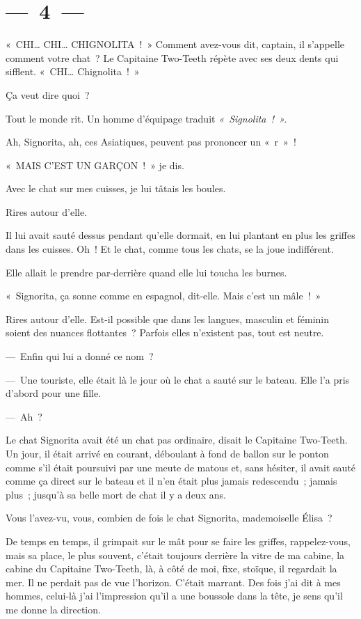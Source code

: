 \documentclass[french,twoside]{book} %
\begin{document}
\section[{— 4 —}]{— 4 —}
\renewcommand{\leftmark}{— 4 —}

\noindent « CHI… CHI… CHIGNOLITA ! » Comment avez-vous dit, captain, il s’appelle comment votre chat ? Le Capitaine Two-Teeth répète avec ses deux dents qui sifflent. « CHI… Chignolita ! »\par
Ça veut dire quoi ?\par
Tout le monde rit. Un homme d’équipage traduit \emph{« Signolita ! ».}\par
Ah, Signorita, ah, ces Asiatiques, peuvent pas prononcer un « r » !\par
« MAIS C’EST UN GARÇON ! » je dis.\par
Avec le chat sur mes cuisses, je lui tâtais les boules.\par
Rires autour d’elle.\par
Il lui avait sauté dessus pendant qu’elle dormait, en lui plantant en plus les griffes dans les cuisses. Oh ! Et le chat, comme tous les chats, se la joue indifférent.\par
Elle allait le prendre par-derrière quand elle lui toucha les burnes.\par
« Signorita, ça sonne comme en espagnol, dit-elle. Mais c’est un mâle ! »\par
Rires autour d’elle. Est-il possible que dans les langues, masculin et féminin soient des nuances flottantes ? Parfois elles n’existent pas, tout est neutre.\par
— Enfin qui lui a donné ce nom ?\par
— Une touriste, elle était là le jour où le chat a sauté sur le bateau. Elle l’a pris d’abord pour une fille.\par
— Ah ?\par
Le chat Signorita avait été un chat pas ordinaire, disait le Capitaine Two-Teeth. Un jour, il était arrivé en courant, déboulant à fond de ballon sur le ponton comme s’il était poursuivi par une meute de matous et, sans hésiter, il avait sauté comme ça direct sur le bateau et il n’en était plus jamais redescendu ; jamais plus ; jusqu’à sa belle mort de chat il y a deux ans.\par
Vous l’avez-vu, vous, combien de fois le chat Signorita, mademoiselle Élisa ?\par
De temps en temps, il grimpait sur le mât pour se faire les griffes, rappelez-vous, mais sa place, le plus souvent, c’était toujours derrière la vitre de ma cabine, la cabine du Capitaine Two-Teeth, là, à côté de moi, fixe, stoïque, il regardait la mer. Il ne perdait pas de vue l’horizon. C’était marrant. Des fois j’ai dit à mes hommes, celui-là j’ai l’impression qu’il a une boussole dans la tête, je sens qu’il me donne la direction.\par
\end{document}

